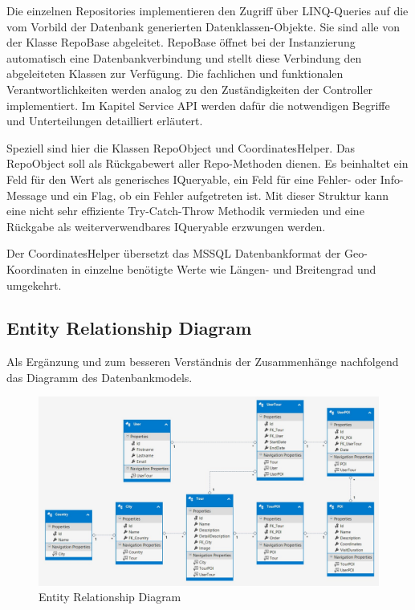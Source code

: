\documentclass[a4paper,10pt,xetex]{article}
\begin{document}
Die einzelnen Repositories implementieren den Zugriff \"uber LINQ-Queries auf die vom Vorbild der Datenbank generierten
Datenklassen\--Objekte. Sie sind alle von der Klasse RepoBase abgeleitet. RepoBase \"offnet bei der Instanzierung
automatisch eine Datenbankverbindung und stellt diese Verbindung den abgeleiteten Klassen zur Verf\"ugung. Die fachlichen und
funktionalen Verantwortlichkeiten werden analog zu den Zust\"andigkeiten der Controller implementiert. Im Kapitel
Service API werden daf\"ur die notwendigen Begriffe und Unterteilungen detailliert erl\"autert.

Speziell sind hier die Klassen RepoObject und CoordinatesHelper. Das RepoObject soll als R\"uckgabewert aller
Repo-Methoden dienen. Es beinhaltet ein Feld f\"ur den Wert als generisches IQueryable, ein Feld f\"ur eine Fehler-
oder Info-Message und ein Flag, ob ein Fehler aufgetreten ist. Mit dieser Struktur kann eine nicht sehr effiziente
Try-Catch-Throw Methodik vermieden und eine R\"uckgabe als weiterverwendbares IQueryable erzwungen werden.

Der CoordinatesHelper \"ubersetzt das MSSQL Datenbankformat der Geo-Koordinaten in einzelne ben\"otigte Werte wie
L\"angen- und Breitengrad und umgekehrt.

\newpage
\subsection{Entity Relationship Diagram}\label{erm}
Als Erg\"anzung und zum besseren Verst\"andnis der Zusammenh\"ange nachfolgend das Diagramm des Datenbankmodels.

\begin{figure}
  \centering
  \includegraphics{erm}
  \caption{Entity Relationship Diagram}
\end{figure}
\end{document}
